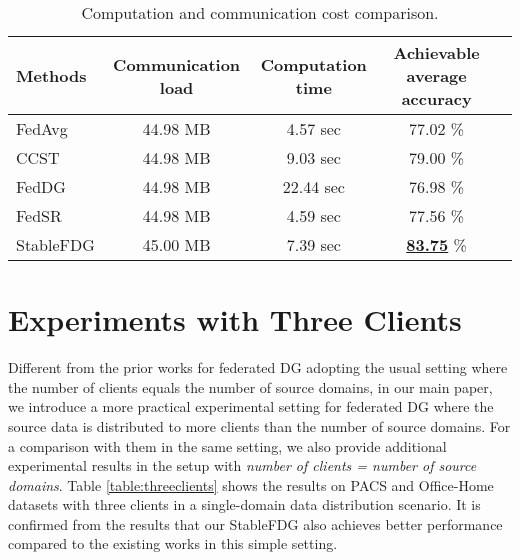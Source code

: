 \documentclass{article}
\theoremstyle{plain}
\theoremstyle{definition}
\theoremstyle{remark}
\begin{document}
\begin{table}[h]
\small
\centering
	\begin{tabular}{l|    ccc c}
		\toprule  
		Methods   &Communication load &Computation time &Achievable average accuracy \\ 
		\midrule	
		FedAvg \cite{mcmahan2017communication} & 44.98 MB & 4.57 sec & 77.02 \% \\ 
		CCST \cite{chen2023federated} & 44.98 MB & 9.03 sec & 79.00 \% \\
		FedDG  \cite{liu2021feddg}  &44.98 MB & 22.44 sec &  76.98 \%   \\
	   	FedSR  \cite{nguyen2022fedsr} & 44.98 MB & 4.59 sec & 77.56 \% \\
		StableFDG &45.00 MB & 7.39 sec & \textbf{\underline{83.75}} \% \\
		\bottomrule
	\end{tabular}
\vspace{+3mm}
\caption{Computation and communication cost comparison. } 
\label{table:complexity}
\end{table} 




\section{Experiments with Three Clients}
Different from the prior works \cite{chen2023federated, nguyen2022fedsr} for federated DG adopting the usual setting where the number of clients equals the number of source domains, in our main paper, we introduce a more practical experimental setting for federated DG where the source data is distributed to more clients than the number of source domains. For a comparison with them in the same setting, we also provide additional experimental results in the setup with \textit{number of clients = number of source domains}. Table \ref{table:threeclients} shows the results on PACS and Office-Home datasets with three clients in a single-domain data distribution scenario. It is confirmed from the results that our StableFDG also achieves better performance compared to the existing works \cite{chen2023federated, nguyen2022fedsr} in this simple setting.
\end{document}
